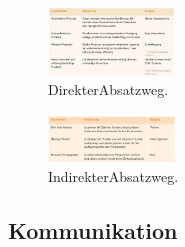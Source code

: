 \documentclass[../ZF_Wing.tex]{subfiles}
\begin{document}
\begin{multicols}{2}

\begin{figure}[H]
\centering
\includegraphics[width=0.3\textwidth]{Resources/Image/DirekterAbsatzweg.png}
\caption{\label{fig:DirekterAbsatzwe}DirekterAbsatzweg.}
\end{figure}


\columnbreak

\begin{figure}[H]
\centering
\includegraphics[width=0.3\textwidth]{Resources/Image/IndirekterAbsatzweg.png}
\caption{\label{fig:IndirekterAbsatzweg}IndirekterAbsatzweg.}
\end{figure}

\end{multicols}


\subsection{Kommunikation}
\end{document}

